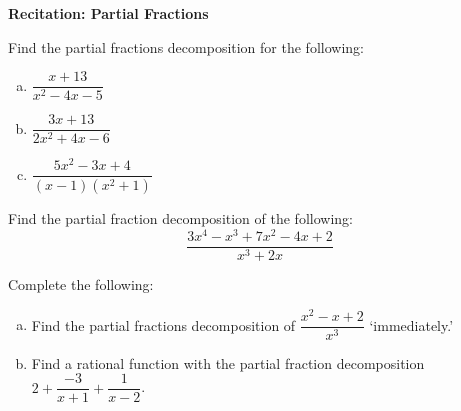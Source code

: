 \documentclass[11pt,letterpaper]{article}
\begin{document}

\phantom{} \hfill {\bfseries \Large Recitation: Partial Fractions} \hfill \phantom{} \par\vspace{0.5cm}

 Find the partial fractions decomposition for the following:
	\begin{enumerate}[(a)]
	\item $\dfrac{x + 13}{x^2 - 4x - 5}$ \vfill
	\item $\dfrac{3x + 13}{2x^2 + 4x - 6}$ \vfill
	\item $\dfrac{5x^2 - 3x + 4}{(x - 1)(x^2 + 1)}$ \vfill
	\end{enumerate}



\newpage



 Find the partial fraction decomposition of the following:
	\[
	\dfrac{3x^4 - x^3 + 7x^2 - 4x + 2}{x^3 + 2x}
	\] \vfill



 Complete the following:
	\begin{enumerate}[(a)]
	\item Find the partial fractions decomposition of $\dfrac{x^2 - x + 2}{x^3}$ `immediately.' 
	\item Find a rational function with the partial fraction decomposition $2 + \dfrac{-3}{x + 1} + \dfrac{1}{x - 2}$.
	\end{enumerate} \par\vspace{3in}
\end{document}
